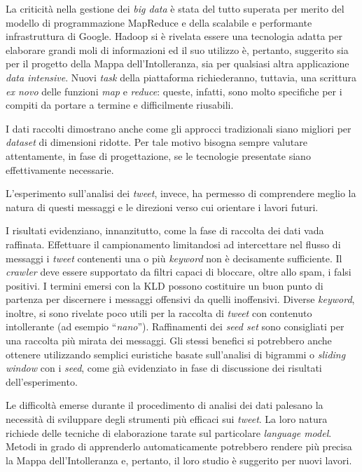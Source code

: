 La criticità nella gestione dei \textit{big data} è stata del tutto superata per merito del modello di programmazione MapReduce e della scalabile e performante infrastruttura di Google. 
Hadoop si è rivelata essere una tecnologia adatta per elaborare grandi moli di informazioni ed il suo utilizzo è, pertanto, suggerito sia per il progetto della Mappa dell'Intolleranza, 
sia per qualsiasi altra applicazione \textit{data intensive}.
Nuovi \textit{task} della piattaforma richiederanno, tuttavia, una scrittura \textit{ex novo} delle funzioni \textit{map} e \textit{reduce}: queste, infatti, sono molto 
specifiche per i compiti da portare a termine e difficilmente riusabili.

I dati raccolti dimostrano anche come gli approcci tradizionali siano migliori per \textit{dataset} di dimensioni ridotte.
Per tale motivo bisogna sempre valutare attentamente, in fase di progettazione, se le tecnologie presentate siano effettivamente necessarie.

L'esperimento sull'analisi dei \textit{tweet}, invece, ha permesso di comprendere meglio la natura di questi messaggi e le direzioni verso cui orientare
i lavori futuri.

I risultati evidenziano, innanzitutto, come la fase di raccolta dei dati vada raffinata.
Effettuare il campionamento limitandosi ad intercettare nel flusso di messaggi i \textit{tweet} contenenti una o più
\textit{keyword} non è decisamente sufficiente.
Il \textit{crawler} deve essere supportato da filtri capaci di bloccare, oltre allo spam, i falsi positivi. I termini emersi con la KLD
possono costituire un buon punto di partenza per discernere i messaggi offensivi da quelli inoffensivi.
Diverse \textit{keyword}, inoltre, si sono rivelate poco utili per la raccolta di \textit{tweet} con contenuto intollerante (ad esempio ``\textit{nano}''). Raffinamenti dei \textit{seed set} sono  
consigliati per una raccolta più mirata dei messaggi.
Gli stessi benefici si potrebbero anche ottenere utilizzando semplici euristiche basate sull'analisi di bigrammi o \textit{sliding window}
con i \textit{seed}, come già evidenziato in fase di discussione dei risultati dell'esperimento.

Le difficoltà emerse durante il procedimento di analisi dei dati palesano la necessità di sviluppare degli strumenti più efficaci sui \textit{tweet}.
La loro natura richiede delle tecniche di elaborazione tarate sul particolare \textit{language model}.
Metodi in grado di apprenderlo automaticamente potrebbero rendere più precisa la Mappa dell'Intolleranza e, pertanto, il loro studio è suggerito per nuovi lavori.

